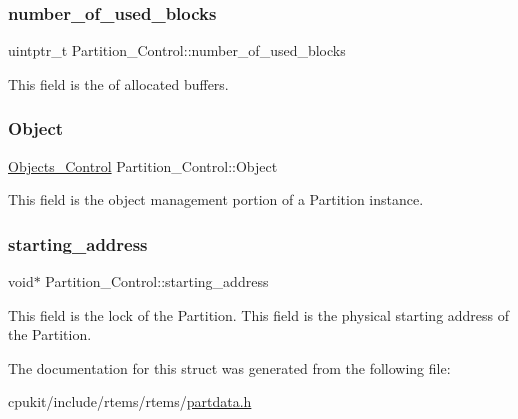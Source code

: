 \subsubsection{\texorpdfstring{number\_of\_used\_blocks}{number\_of\_used\_blocks}}
{\footnotesize\ttfamily uintptr\+\_\+t Partition\+\_\+\+Control\+::number\+\_\+of\+\_\+used\+\_\+blocks}

This field is the of allocated buffers. \mbox{\label{structPartition__Control_afeba3e9a7a011daabfd83cf2f501afa6}} 
\subsubsection{\texorpdfstring{Object}{Object}}
{\footnotesize\ttfamily \mbox{\hyperlink{structObjects__Control}{Objects\+\_\+\+Control}} Partition\+\_\+\+Control\+::\+Object}

This field is the object management portion of a Partition instance. \mbox{\label{structPartition__Control_aefba6f99c4a1747dde63708ca0df7fbb}} 
\subsubsection{\texorpdfstring{starting\_address}{starting\_address}}
{\footnotesize\ttfamily void$\ast$ Partition\+\_\+\+Control\+::starting\+\_\+address}

This field is the lock of the Partition. This field is the physical starting address of the Partition. 

The documentation for this struct was generated from the following file\+:\begin{DoxyCompactItemize}
\item 
cpukit/include/rtems/rtems/\mbox{\hyperlink{partdata_8h}{partdata.\+h}}\end{DoxyCompactItemize}

